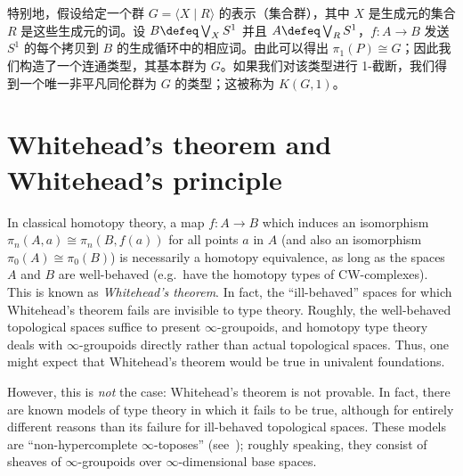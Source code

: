 {\begin{eg}\label{eg:kg1}
特别地，假设给定一个群 $G = \langle X \mid R \rangle$ 的表示（集合群），其中 $X$ 是生成元的集合 $R$ 是这些生成元的词。设 $B\defeq \bigvee_X S^1$ 并且 $A\defeq \bigvee_R S^1$，$f:A\to B$ 发送 $S^1$ 的每个拷贝到 $B$ 的生成循环中的相应词。由此可以得出 $\pi_1(P) \cong G$；因此我们构造了一个连通类型，其基本群为 $G$。如果我们对该类型进行 1-截断，我们得到一个唯一非平凡同伦群为 $G$ 的类型；这被称为 $K(G,1)$。%
%
\end{eg}

%

%
%

\section{Whitehead's theorem and Whitehead's principle}
\label{sec:whitehead}

In classical homotopy theory, a map $f:A\to B$ which induces an isomorphism $\pi_n(A,a) \cong \pi_n(B,f(a))$ for all points $a$ in $A$ (and also an isomorphism $\pi_0(A)\cong\pi_0(B)$) is necessarily a homotopy equivalence, as long as the spaces $A$ and $B$ are well-behaved (e.g.\ have the homotopy types of CW-complexes).
%
%
This is known as \emph{Whitehead's theorem}.
In fact, the ``ill-behaved'' spaces for which Whitehead's theorem fails are invisible to type theory.
Roughly, the well-behaved topological spaces suffice to present $\infty$-groupoids,%
and homotopy type theory deals with $\infty$-groupoids directly rather than actual topological spaces.
Thus, one might expect that Whitehead's theorem would be true in univalent foundations.

However, this is \emph{not} the case: Whitehead's theorem is not provable.
In fact, there are known models of type theory in which it fails to be true, although for entirely different reasons than its failure for ill-behaved topological spaces.
These models are ``non-hypercomplete $\infty$-toposes''
%
%
(see~\cite{lurie:higher-topoi}); roughly speaking, they consist of sheaves of $\infty$-groupoids over $\infty$-dimensional base spaces.

%
%

}
